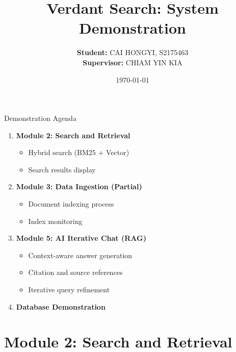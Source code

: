\documentclass[aspectratio=169,xcolor=dvipsnames]{beamer}
\title{Verdant Search: System Demonstration}
\author{
    \textbf{Student:} CAI HONGYI, S2175463 \\[0.3em]
    \textbf{Supervisor:} CHIAM YIN KIA
}
\institute{University of Malaya}
\date{\today}
\begin{document}
\begin{frame}
    \titlepage
\end{frame}

\begin{frame}{Demonstration Agenda}
    \Large
    \begin{enumerate}
        \item \textbf{Module 2: Search and Retrieval}
        \begin{itemize}
            \large
            \item Hybrid search (BM25 + Vector)
            \item Search results display
        \end{itemize}
        
        \vspace{0.5em}
        \item \textbf{Module 3: Data Ingestion (Partial)}
        \begin{itemize}
            \large
            \item Document indexing process
            \item Index monitoring
        \end{itemize}
        
        \vspace{0.5em}
        \item \textbf{Module 5: AI Iterative Chat (RAG)}
        \begin{itemize}
            \large
            \item Context-aware answer generation
            \item Citation and source references
            \item Iterative query refinement
        \end{itemize}
        
        \vspace{0.5em}
        \item \textbf{Database Demonstration}
    \end{enumerate}
\end{frame}

\section{Module 2: Search and Retrieval}
\end{document}
